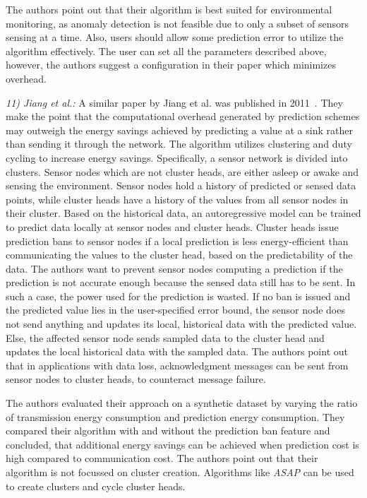 The authors point out that their algorithm is best suited for environmental
monitoring, as anomaly detection is not feasible due to only a subset of
sensors sensing at a time. Also, users should allow some prediction error to
utilize the algorithm effectively. The user can set all the parameters
described above, however, the authors suggest a configuration in their paper
which minimizes overhead.
\par

\textit{11) Jiang et al.:}
A similar paper by Jiang et al. was published in
2011~\cite{jiang2011prediction}. They make the point that the computational
overhead generated by prediction schemes may outweigh the energy savings
achieved by predicting a value at a sink rather than sending it through the
network. The algorithm utilizes clustering and duty cycling to increase energy
savings. Specifically, a sensor network is divided into clusters. Sensor nodes
which are not cluster heads, are either asleep or awake and sensing the
environment. Sensor nodes hold a history of predicted or sensed data points,
while cluster heads have a history of the values from all sensor nodes in their
cluster. Based on the historical data, an autoregressive model can be trained
to predict data locally at sensor nodes and cluster heads. Cluster heads issue
prediction bans to sensor nodes if a local prediction is less energy-efficient
than communicating the values to the cluster head, based on the predictability
of the data. The authors want to prevent sensor nodes computing a prediction if
the prediction is not accurate enough because the sensed data still has to be
sent. In such a case, the power used for the prediction is wasted. If no ban is
issued and the predicted value lies in the user-specified error bound, the
sensor node does not send anything and updates its local, historical data with
the predicted value. Else, the affected sensor node sends sampled data to the
cluster head and updates the local historical data with the sampled data. The
authors point out that in applications with data loss, acknowledgment messages
can be sent from sensor nodes to cluster heads, to counteract message failure.

The authors evaluated their approach on a synthetic dataset by varying the
ratio of transmission energy consumption and prediction energy consumption.
They compared their algorithm with and without the prediction ban feature and
concluded, that additional energy savings can be achieved when prediction cost
is high compared to communication cost. The authors point out that their
algorithm is not focussed on cluster creation. Algorithms like \textit{ASAP}
can be used to create clusters and cycle cluster heads.

